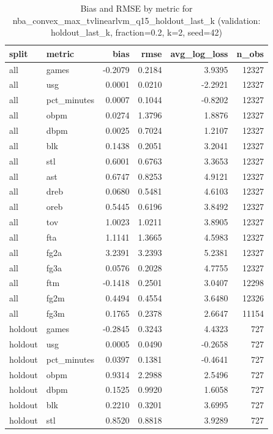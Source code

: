 \begin{table}
\caption{Bias and RMSE by metric for nba_convex_max_tvlinearlvm_q15_holdout_last_k (validation: holdout_last_k, fraction=0.2, k=2, seed=42)}
\label{tab:nba_convex_max_tvlinearlvm_q15_holdout_last_k_vs_holdout_last_k_f20_k2_s42_bias_rmse}
\begin{tabular}{llrrrr}
\toprule
split & metric & bias & rmse & avg\_log\_loss & n\_obs \\
\midrule
all & games & -0.2079 & 0.2184 & 3.9395 & 12327 \\
all & usg & 0.0001 & 0.0210 & -2.2921 & 12327 \\
all & pct\_minutes & 0.0007 & 0.1044 & -0.8202 & 12327 \\
all & obpm & 0.0274 & 1.3796 & 1.8876 & 12327 \\
all & dbpm & 0.0025 & 0.7024 & 1.2107 & 12327 \\
all & blk & 0.1438 & 0.2051 & 3.2041 & 12327 \\
all & stl & 0.6001 & 0.6763 & 3.3653 & 12327 \\
all & ast & 0.6747 & 0.8253 & 4.9121 & 12327 \\
all & dreb & 0.0680 & 0.5481 & 4.6103 & 12327 \\
all & oreb & 0.5445 & 0.6196 & 3.8492 & 12327 \\
all & tov & 1.0023 & 1.0211 & 3.8905 & 12327 \\
all & fta & 1.1141 & 1.3665 & 4.5983 & 12327 \\
all & fg2a & 3.2391 & 3.2393 & 5.2381 & 12327 \\
all & fg3a & 0.0576 & 0.2028 & 4.7755 & 12327 \\
all & ftm & -0.1418 & 0.2501 & 3.0407 & 12298 \\
all & fg2m & 0.4494 & 0.4554 & 3.6480 & 12326 \\
all & fg3m & 0.1765 & 0.2378 & 2.6647 & 11154 \\
holdout & games & -0.2845 & 0.3243 & 4.4323 & 727 \\
holdout & usg & 0.0005 & 0.0490 & -0.2658 & 727 \\
holdout & pct\_minutes & 0.0397 & 0.1381 & -0.4641 & 727 \\
holdout & obpm & 0.9314 & 2.2988 & 2.5496 & 727 \\
holdout & dbpm & 0.1525 & 0.9920 & 1.6058 & 727 \\
holdout & blk & 0.2210 & 0.3201 & 3.6995 & 727 \\
holdout & stl & 0.8520 & 0.8818 & 3.9289 & 727 \\

\end{tabular}
\end{table}
